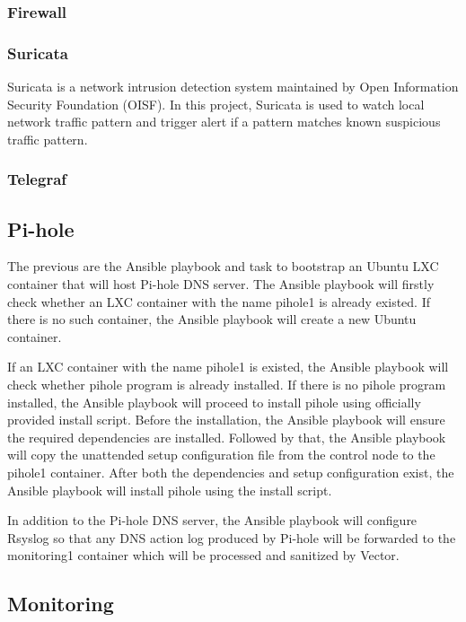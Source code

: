 \documentclass[../index.tex]{subfiles}
\begin{document}
\subsubsection{Firewall}

\subsubsection{Suricata}

Suricata is a network intrusion detection system maintained by Open Information Security Foundation
(OISF). In this project, Suricata is used to watch local network traffic pattern and trigger alert
if a pattern matches known suspicious traffic pattern.

\subsubsection{Telegraf}

\subsection{Pi-hole}

The previous are the Ansible playbook and task to bootstrap an Ubuntu LXC container that will host
Pi-hole DNS server. The Ansible playbook will firstly check whether an LXC container with the name
pihole1 is already existed. If there is no such container, the Ansible playbook will create a new
Ubuntu container.

If an LXC container with the name pihole1 is existed, the Ansible playbook will check whether pihole
program is already installed. If there is no pihole program installed, the Ansible playbook will
proceed to install pihole using officially provided install script. Before the installation, the
Ansible playbook will ensure the required dependencies are installed. Followed by that, the Ansible
playbook will copy the unattended setup configuration file from the control node to the pihole1
container. After both the dependencies and setup configuration exist, the Ansible playbook will
install pihole using the install script.

In addition to the Pi-hole DNS server, the Ansible playbook will configure Rsyslog so that any DNS
action log produced by Pi-hole will be forwarded to the monitoring1 container which will be
processed and sanitized by Vector.

\subsection{Monitoring}
\end{document}
